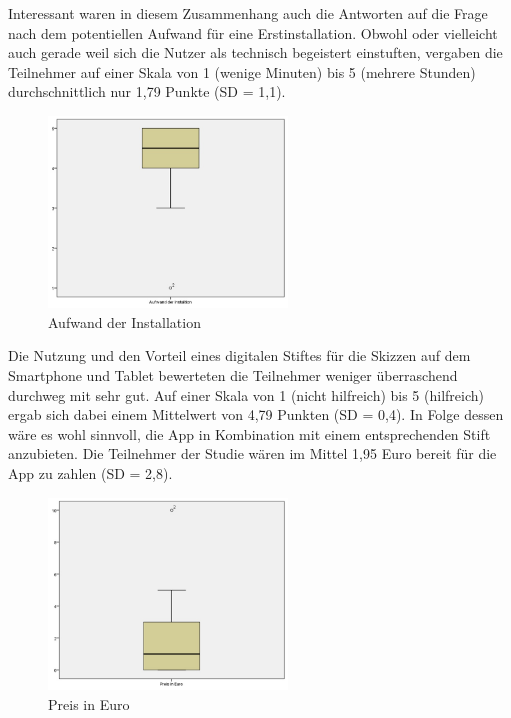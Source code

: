 \documentclass{chi-ext}
\begin{document}
Interessant waren in diesem Zusammenhang auch die Antworten auf die Frage nach dem potentiellen Aufwand für eine Erstinstallation. Obwohl oder vielleicht auch gerade weil sich die Nutzer als technisch begeistert einstuften, vergaben die Teilnehmer auf einer Skala von 1 (wenige Minuten) bis 5 (mehrere Stunden) durchschnittlich nur 1,79 Punkte (SD = 1,1).

\begin{figure}
  \centering
  \includegraphics[width=180pt]{img/studie/Aufwand_Installation.jpg}
  \caption{Aufwand der Installation}
  \label{fig:studie_Aufwand_Installation}
\end{figure}

Die Nutzung und den Vorteil eines digitalen Stiftes für die Skizzen auf dem Smartphone und Tablet bewerteten die Teilnehmer weniger überraschend durchweg mit sehr gut. Auf einer Skala von 1 (nicht hilfreich) bis 5 (hilfreich) ergab sich dabei einem Mittelwert von 4,79 Punkten (SD = 0,4). In Folge dessen wäre es wohl sinnvoll, die App in Kombination mit einem entsprechenden Stift anzubieten. Die Teilnehmer der Studie  wären im Mittel 1,95 Euro bereit für die App zu zahlen (SD = 2,8).

\begin{figure}
  \centering
  \includegraphics[width=180pt]{img/studie/Preis.jpg}
  \caption{Preis in Euro}
  \label{fig:studie_Preis}
\end{figure}
\end{document}
